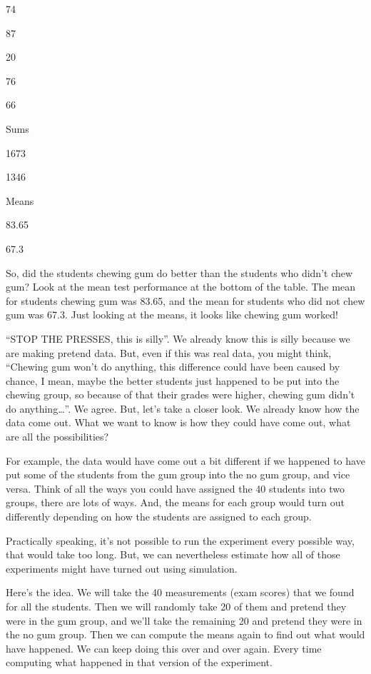 \documentclass[]{book}
\begin{document}
74

87

20

76

66

Sums

1673

1346

Means

83.65

67.3

So, did the students chewing gum do better than the students who didn't chew gum? Look at the mean test performance at the bottom of the table. The mean for students chewing gum was 83.65, and the mean for students who did not chew gum was 67.3. Just looking at the means, it looks like chewing gum worked!

``STOP THE PRESSES, this is silly''. We already know this is silly because we are making pretend data. But, even if this was real data, you might think, ``Chewing gum won't do anything, this difference could have been caused by chance, I mean, maybe the better students just happened to be put into the chewing group, so because of that their grades were higher, chewing gum didn't do anything\ldots{}''. We agree. But, let's take a closer look. We already know how the data come out. What we want to know is how they could have come out, what are all the possibilities?

For example, the data would have come out a bit different if we happened to have put some of the students from the gum group into the no gum group, and vice versa. Think of all the ways you could have assigned the 40 students into two groups, there are lots of ways. And, the means for each group would turn out differently depending on how the students are assigned to each group.

Practically speaking, it's not possible to run the experiment every possible way, that would take too long. But, we can nevertheless estimate how all of those experiments might have turned out using simulation.

Here's the idea. We will take the 40 measurements (exam scores) that we found for all the students. Then we will randomly take 20 of them and pretend they were in the gum group, and we'll take the remaining 20 and pretend they were in the no gum group. Then we can compute the means again to find out what would have happened. We can keep doing this over and over again. Every time computing what happened in that version of the experiment.
\end{document}
